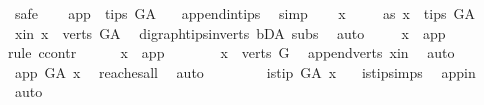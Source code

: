 \begin{isabellebody}
\ safe\isanewline
\ \ \isamarkupfalse%
\ {\isachardoublequoteopen}app\ {\isasymin}\ tips\ G{\isacharunderscore}{\kern0pt}A\ {\isachardoublequoteclose}\ \isamarkupfalse%
\ append{\isacharunderscore}{\kern0pt}in{\isacharunderscore}{\kern0pt}tips\ \isamarkupfalse%
\ simp\isanewline
\ \ \isamarkupfalse%
\ x\ \isanewline
\ \ \isamarkupfalse%
\ as{}{\isacharcolon}{\kern0pt}\ {\isachardoublequoteopen}x\ {\isasymin}\ tips\ G{\isacharunderscore}{\kern0pt}A{\isachardoublequoteclose}\isanewline
\ \ \isamarkupfalse%
\ \isamarkupfalse%
\ x{\isacharunderscore}{\kern0pt}in{\isacharcolon}{\kern0pt}\ {\isachardoublequoteopen}x\ {\isasymin}\ verts\ G{\isacharunderscore}{\kern0pt}A{\isachardoublequoteclose}\ \isamarkupfalse%
\ digraph{\isachardot}{\kern0pt}tips{\isacharunderscore}{\kern0pt}in{\isacharunderscore}{\kern0pt}verts\ bD{\isacharunderscore}{\kern0pt}A\ subs\ \isamarkupfalse%
\ auto\ \isanewline
\ \ \isamarkupfalse%
\ {\isachardoublequoteopen}x\ {\isacharequal}{\kern0pt}\ app{\isachardoublequoteclose}\isanewline
\ \ \isamarkupfalse%
{\isacharparenleft}{\kern0pt}rule\ ccontr{\isacharparenright}{\kern0pt}\isanewline
\ \ \ \ \isamarkupfalse%
\ {\isachardoublequoteopen}x\ {\isasymnoteq}\ app{\isachardoublequoteclose}\isanewline
\ \ \ \ \isamarkupfalse%
\ \isamarkupfalse%
\ {\isachardoublequoteopen}x\ {\isasymin}\ verts\ G{\isachardoublequoteclose}\ \isamarkupfalse%
\ append{\isacharunderscore}{\kern0pt}verts\ x{\isacharunderscore}{\kern0pt}in\ \isamarkupfalse%
\ auto\isanewline
\ \ \ \ \isamarkupfalse%
\ \isamarkupfalse%
\ {\isachardoublequoteopen}app\ {\isasymrightarrow}\isactrlsup {\isacharplus}{\kern0pt}\isactrlbsub G{\isacharunderscore}{\kern0pt}A\isactrlesub \ x{\isachardoublequoteclose}\ \isamarkupfalse%
\ reaches{\isacharunderscore}{\kern0pt}all\ \isamarkupfalse%
\ auto\isanewline
\ \ \ \ \isamarkupfalse%
\ \isamarkupfalse%
\ {\isachardoublequoteopen}{\isasymnot}\ is{\isacharunderscore}{\kern0pt}tip\ G{\isacharunderscore}{\kern0pt}A\ x{\isachardoublequoteclose}\ \ \isamarkupfalse%
\ is{\isacharunderscore}{\kern0pt}tip{\isachardot}{\kern0pt}simps\ \isamarkupfalse%
\ app{\isacharunderscore}{\kern0pt}in\ \isamarkupfalse%
\ auto\isanewline

\end{isabellebody}
